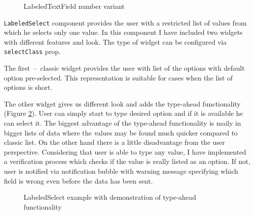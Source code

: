 \begin{figure}[h]
\caption{LabeledTextField number variant}
\label{labelledTextField}
\end{figure} 

\texttt{LabeledSelect} component provides the user with a restricted list of values from which he selects only one value. In this component I have included two widgets with different features and look. The type of widget can be configured via \texttt{selectClass} prop. 

The first~--~classic widget provides the user with list of the options with default option pre-selected. This representation is suitable for cases when the list of options is short.

The other widget gives us different look and adds the type-ahead functionality (Figure \ref{labelledSelect}). User can simply start to type desired option and if it is available he can select it. The biggest advantage of the type-ahead functionality is maily in bigger lists of data where the values may be found much quicker compared to classic list. On the other hand there is a little disadvantage from the user perspective. Considering that user is able to type any value, I have implemented a verification process which checks if the value is really listed as an option. If not, user is notified via notification bubble with warning message specifying which field is wrong even before the data has been sent.

\begin{figure}[h]
\caption{LabeledSelect example with demonstration of type-ahead functionality}
\label{labelledSelect}
\end{figure} 

